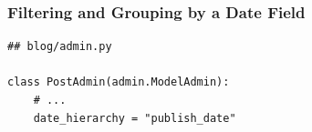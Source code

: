 \documentclass[aspectratio=169]{beamer}
\begin{document}
\begin{frame}
  \begin{figure}[p]
    \centering
  \end{figure}
\end{frame}


\begin{frame}[fragile]
\frametitle{Filtering and Grouping by a Date Field}

{\tiny
\begin{verbatim}
## blog/admin.py

class PostAdmin(admin.ModelAdmin):
    # ...
    date_hierarchy = "publish_date"
\end{verbatim}
} 
\end{frame}
\begin{frame}
\begin{figure}[p]
  \centering
\end{figure}

\end{frame}
\end{document}
